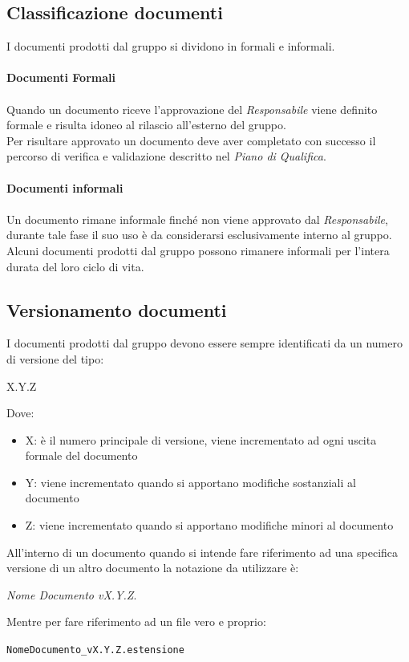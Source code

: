 \documentclass[a4paper]{report}
\begin{document}
	\subsection{Classificazione documenti}
	I documenti prodotti dal gruppo si dividono in formali e informali. \\ \\
	\textbf{Documenti Formali} \\ \\
	Quando un documento riceve l'approvazione del \emph{Responsabile} viene definito formale e risulta idoneo
	al rilascio all'esterno del gruppo. \\
	Per risultare approvato un documento deve aver completato con successo il percorso di verifica e validazione 
	descritto nel \emph{Piano di Qualifica}. \\ \\
	\textbf{Documenti informali} \\ \\
	Un documento rimane informale finché non viene approvato dal \emph{Responsabile}, durante tale fase 
	il suo uso è da considerarsi esclusivamente interno al gruppo. \\
	Alcuni documenti prodotti dal gruppo possono rimanere informali per l'intera durata del loro ciclo di vita.
	\subsection{Versionamento documenti}
	I documenti prodotti dal gruppo devono essere sempre identificati da un numero di versione del tipo:
	\begin{center}
		X.Y.Z
	\end{center}
	Dove:
	\begin{itemize}
		\item X: è il numero principale di versione, viene incrementato ad ogni uscita formale del documento
		\item Y: viene incrementato quando si apportano modifiche sostanziali al documento
		\item Z: viene incrementato quando si apportano modifiche minori al documento
	\end{itemize}
	All'interno di un documento quando si intende fare riferimento ad una specifica versione di un altro documento la
	notazione da utilizzare è: 
	\begin{center}
		\emph{Nome Documento vX.Y.Z}.
	\end{center}
	Mentre per fare riferimento ad un file vero e proprio:
	\begin{center}
		\verb|NomeDocumento_vX.Y.Z.estensione|
	\end{center}
\end{document}

